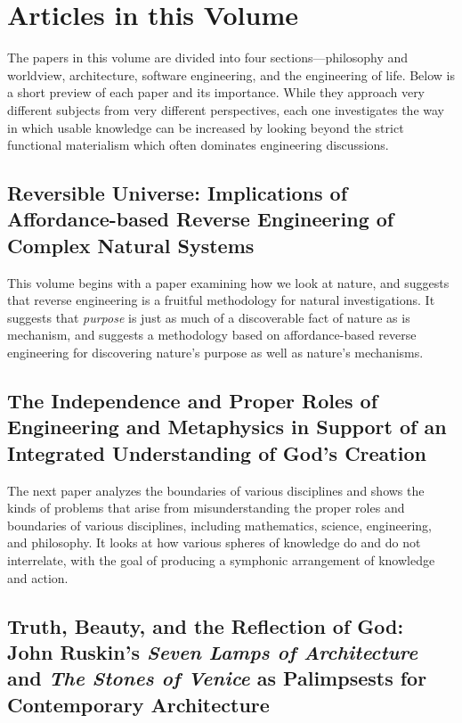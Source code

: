 \section{Articles in this Volume}

The papers in this volume are divided into four sections---philosophy and worldview, architecture, software engineering, and the engineering of life.  Below is a short preview of each paper and its importance.  While they
approach very different subjects from very different perspectives, each one investigates the way in which usable knowledge can be increased by looking beyond the strict functional materialism which often dominates engineering discussions.

\subsection*{Reversible Universe: Implications of Affordance-based Reverse Engineering of Complex Natural Systems}

This volume begins with a paper examining how we look at nature, and suggests that reverse engineering is a fruitful methodology for natural investigations.  It suggests that \emph{purpose} is just as much of a discoverable fact of nature as is mechanism, and suggests a methodology based on affordance-based reverse engineering for discovering nature's purpose as well as nature's mechanisms.  

\subsection*{The Independence and Proper Roles of Engineering and Metaphysics in Support of an Integrated Understanding of God's Creation}

The next paper analyzes the boundaries of various disciplines and shows the kinds of problems that arise from misunderstanding the proper roles and boundaries of various disciplines, including mathematics, science, engineering, and philosophy.  It looks at how various spheres of knowledge do and do not interrelate, with the goal of producing a symphonic arrangement of knowledge and action.

\subsection*{Truth, Beauty, and the Reflection of God: John Ruskin's \textit{Seven Lamps of Architecture} and \textit{The Stones of Venice} as Palimpsests for Contemporary Architecture}

